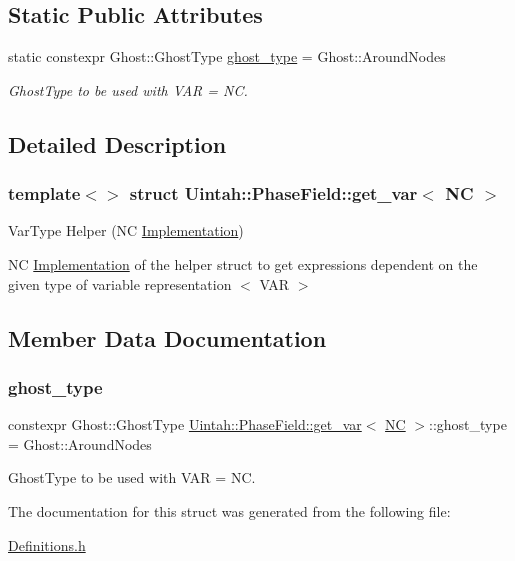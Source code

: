 \subsection*{Static Public Attributes}
\begin{DoxyCompactItemize}
\item 
static constexpr Ghost\+::\+Ghost\+Type \hyperlink{structUintah_1_1PhaseField_1_1get__var_3_01NC_01_4_a6a288574616e5a5d4edf754ab86a315e}{ghost\+\_\+type} = Ghost\+::\+Around\+Nodes
\begin{DoxyCompactList}\small\item\em Ghost\+Type to be used with V\+AR = NC. \end{DoxyCompactList}\end{DoxyCompactItemize}


\subsection{Detailed Description}
\subsubsection*{template$<$$>$\newline
struct Uintah\+::\+Phase\+Field\+::get\+\_\+var$<$ N\+C $>$}

Var\+Type Helper (NC \hyperlink{classUintah_1_1PhaseField_1_1Implementation}{Implementation}) 

NC \hyperlink{classUintah_1_1PhaseField_1_1Implementation}{Implementation} of the helper struct to get expressions dependent on the given type of variable representation $<$ V\+AR $>$ 

\subsection{Member Data Documentation}
\mbox{\label{structUintah_1_1PhaseField_1_1get__var_3_01NC_01_4_a6a288574616e5a5d4edf754ab86a315e}} 
\subsubsection{\texorpdfstring{ghost\+\_\+type}{ghost\_type}}
{\footnotesize\ttfamily constexpr Ghost\+::\+Ghost\+Type \hyperlink{structUintah_1_1PhaseField_1_1get__var}{Uintah\+::\+Phase\+Field\+::get\+\_\+var}$<$ \hyperlink{namespaceUintah_1_1PhaseField_a33d355affda78a83f45755ba8388cedda77924170fe82bfd58b74ca3e44139718}{NC} $>$\+::ghost\+\_\+type = Ghost\+::\+Around\+Nodes\hspace{0.3cm}{\ttfamily [static]}}



Ghost\+Type to be used with V\+AR = NC. 



The documentation for this struct was generated from the following file\+:\begin{DoxyCompactItemize}
\item 
\hyperlink{Definitions_8h}{Definitions.\+h}\end{DoxyCompactItemize}
